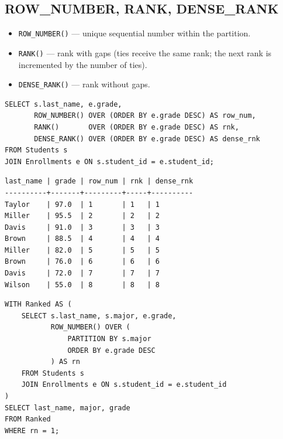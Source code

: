 \subsection{ROW\_NUMBER, RANK, DENSE\_RANK}

\begin{definition}
\begin{itemize}
    \item \texttt{ROW\_NUMBER()} --- unique sequential number within the partition.
    \item \texttt{RANK()} --- rank with gaps (ties receive the same rank; the
          next rank is incremented by the number of ties).
    \item \texttt{DENSE\_RANK()} --- rank without gaps.
\end{itemize}
\end{definition}

\begin{codeblock}[title=\textbf{Ranking Students by Grade}]
\begin{verbatim}
SELECT s.last_name, e.grade,
       ROW_NUMBER() OVER (ORDER BY e.grade DESC) AS row_num,
       RANK()       OVER (ORDER BY e.grade DESC) AS rnk,
       DENSE_RANK() OVER (ORDER BY e.grade DESC) AS dense_rnk
FROM Students s
JOIN Enrollments e ON s.student_id = e.student_id;
\end{verbatim}
\end{codeblock}

\begin{codeoutput}
\begin{verbatim}
last_name | grade | row_num | rnk | dense_rnk
----------+-------+---------+-----+----------
Taylor    | 97.0  | 1       | 1   | 1
Miller    | 95.5  | 2       | 2   | 2
Davis     | 91.0  | 3       | 3   | 3
Brown     | 88.5  | 4       | 4   | 4
Miller    | 82.0  | 5       | 5   | 5
Brown     | 76.0  | 6       | 6   | 6
Davis     | 72.0  | 7       | 7   | 7
Wilson    | 55.0  | 8       | 8   | 8
\end{verbatim}
\end{codeoutput}

\begin{codeblock}[title=\textbf{Top Student per Major (Top-N per Group)}]
\begin{verbatim}
WITH Ranked AS (
    SELECT s.last_name, s.major, e.grade,
           ROW_NUMBER() OVER (
               PARTITION BY s.major
               ORDER BY e.grade DESC
           ) AS rn
    FROM Students s
    JOIN Enrollments e ON s.student_id = e.student_id
)
SELECT last_name, major, grade
FROM Ranked
WHERE rn = 1;
\end{verbatim}
\end{codeblock}

